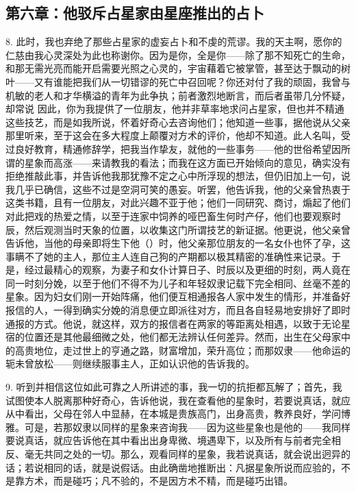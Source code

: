 
\subsection{第六章：他驳斥占星家由星座推出的占卜}

8. 此时，我也弃绝了那些占星家的虚妄占卜和不虔的荒谬。我的天主啊，愿你的仁慈由我心灵深处为此也称谢你。因为是你，全是你——除了那不知死亡的生命，和那无需光亮而能开启需要光照之心灵的，宇宙藉着它被掌管，甚至达于飘动的树叶——又有谁能把我们从一切错谬的死亡中召回呢？你还对付了我的顽固，我曾与机敏的老人和才华横溢的青年为此争执；前者激烈地断言，而后者虽带几分怀疑，却常说  因此，你为我提供了一位朋友，他并非草率地求问占星家，但也并不精通这些技艺，而是如我所说，怀着好奇心去咨询他们；他知道一些事，据他说从父亲那里听来，至于这会在多大程度上颠覆对方术的评价，他却不知道。此人名叫，受过良好教育，精通修辞学，把我当作挚友，就他的一些事务——他的世俗希望因所谓的星象而高涨——来请教我的看法；而我在这方面已开始倾向的意见，确实没有拒绝推敲此事，并告诉他我那犹豫不定之心中所浮现的想法，但仍旧加上一句，说我几乎已确信，这些不过是空洞可笑的愚妄。听罢，他告诉我，他的父亲曾热衷于这类书籍，且有一位朋友，对此兴趣不亚于他；他们一同研究、商讨，煽起了他们对此把戏的热爱之情，以至于连家中饲养的哑巴畜生何时产仔，他们也要观察时辰，然后观测当时天象的位置，以收集这门所谓技艺的新证据。他更说，他父亲曾告诉他，当他的母亲即将生下他（）时，他父亲那位朋友的一名女仆也怀了孕，这事瞒不了她的主人，那位主人连自己狗的产期都以极其精密的准确性来记录。于是，经过最精心的观察，为妻子和女仆计算日子、时辰以及更细的时刻，两人竟在同一时刻分娩，以至于他们不得不为儿子和年轻奴隶记载下完全相同、丝毫不差的星象。因为妇女们刚一开始阵痛，他们便互相通报各人家中发生的情形，并准备好报信的人，一得到确实分娩的消息便立即派往对方，而且各自轻易地安排好了即时通报的方式。他说，就这样，双方的报信者在两家的等距离处相遇，以致于无论星宿的位置还是其他最细微之处，他们都无法辨认任何差异。然而，出生在父母家中的高贵地位，走过世上的亨通之路，财富增加，荣升高位；而那奴隶——他命运的轭未曾放松——则继续服事主人，正如认识他的告诉我的。\par

9. 听到并相信这位如此可靠之人所讲述的事，我一切的抗拒都瓦解了；首先，我试图使本人脱离那种好奇心，告诉他说，我在查看他的星象时，若要说真话，就应从中看出，父母在邻人中显赫，在本城是贵族高门，出身高贵，教养良好，学问博雅。可是，若那奴隶以同样的星象来咨询我——因为这些星象也是他的——我同样要说真话，就应告诉他在其中看出出身卑微、境遇卑下，以及所有与前者完全相反、毫无共同之处的一切。那么，观看同样的星象，我若说真话，就会说出迥异的话；若说相同的话，就是说假话。由此确凿地推断出：凡据星象所说而应验的，不是靠方术，而是碰巧；凡不验的，不是因方术不精，而是碰巧出错。\par

